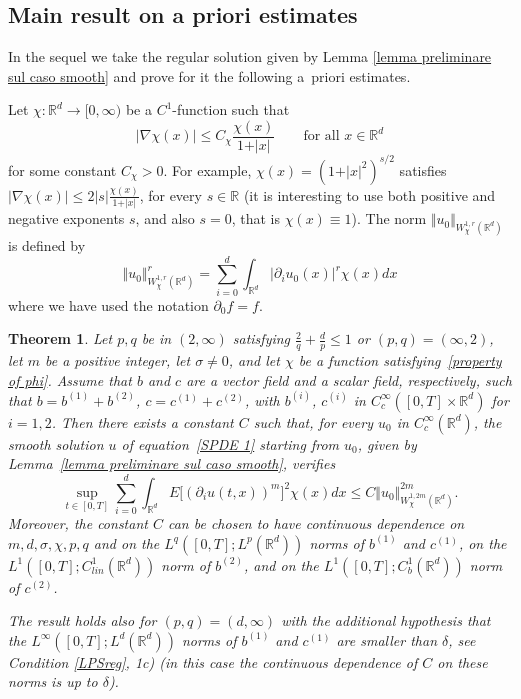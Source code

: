\documentclass[a4paper,10pt]{article}
\newtheorem{theorem}{Theorem}
\begin{document}
\subsection{Main result on a priori estimates}

In the sequel we take the regular solution given by Lemma
\ref{lemma preliminare sul caso smooth} and prove for it the following a~priori estimates.

Let $\chi \colon \mathbb{R}^{d}\rightarrow [0,\infty)$ be a $C^{1}$-function
such that
\begin{equation}
\vert \nabla \chi (x) \vert \leq C_{\chi} \frac{\chi(x)}{1+\vert x\vert} \qquad \text{for all } x \in \mathbb{R}^{d}
\label{property of phi}
\end{equation}
for some constant $C_{\chi}>0$. For example, $\chi(x)  =(1+\vert x\vert^{2})^{s/2}$ satisfies $\vert \nabla\chi(x)\vert \leq 2 \vert s \vert \frac{\chi(x)}{1+\vert x \vert}$, for every
$s\in\mathbb{R}$ (it is interesting to use both positive and negative
exponents $s$, and also $s=0$, that is $\chi(x) \equiv1$). The norm
$\Vert u_{0}\Vert_{W_{\chi}^{1,r}(\mathbb{R}^{d})}$ is defined by
\[
\Vert u_{0} \Vert_{W_{\chi}^{1,r} (\mathbb{R}^{d})}^{r} = \sum_{i=0}^{d} \int_{\mathbb{R}^{d}} \vert \partial_{i}u_{0}(x) \vert^{r} \chi(x)  dx
\]
where we have used the notation $\partial_{0}f=f$.

\begin{theorem}
\label{theorem a priori estimate} Let $p,q$ be in $(2,\infty)$
satisfying $\frac{2}{q}+\frac{d}{p}\leq1$ or $(p,q)=(\infty,2)$,
let $m$ be a positive integer, let $\sigma \neq 0$, and let $\chi$ be a function 
satisfying~\eqref{property of phi}. Assume that $b$ and $c$ are a vector field and a scalar field, respectively, such that $b=b^{(1)}+b^{(2)}$, $c=c^{(1)}+c^{(2)}$, with $b^{(i)}$, $c^{(i)}$ in $C_{c}^{\infty}([0,T]\times \mathbb{R}^{d})$ for $i=1,2$. 
Then there exists a constant $C$ such that, for every $u_{0}$ in $C_{c}^{\infty}(\mathbb{R}^{d})$, the smooth solution $u$ of equation~\eqref{SPDE 1} starting from $u_{0}$, given by Lemma~\ref{lemma preliminare sul caso smooth}, verifies
\[
\sup_{t\in [0,T]}\sum_{i=0}^{d} \int_{\mathbb{R}^{d}} E\big[ (\partial_{i}u(t,x))^{m} \big]^{2} \chi(x) dx\leq C \Vert u_{0} \Vert_{W_{\chi}^{1,2m}(\mathbb{R}^{d}) }^{2m}.
\]
Moreover, the constant $C$ can be chosen to have continuous dependence on $m,d,\sigma
,\chi,p,q$ and on the $L^{q}([0,T];L^{p}(\mathbb{R}^{d}))$ norms of $b^{(1)}$
and $c^{(1)}$, on the $L^{1}([0,T];C_{lin}^{1}(\mathbb{R}^{d}))$ norm of
$b^{(2)}$, and on the $L^{1}([0,T];C_{b}^{1}(\mathbb{R}^{d}))$ norm of $c^{(2)}$.

The result holds also for $(p,q)=(d,\infty)$ with the additional
hypothesis that the $L^{\infty}([0,T];L^{d}(\mathbb{R}^{d}))$ norms of
$b^{(1)}$ and $c^{(1)}$ are smaller than $\delta$, see Condition
\ref{LPSreg}, 1c) (in this case the continuous dependence of $C$ on these norms
is up to $\delta$).
\end{theorem}
\end{document}
